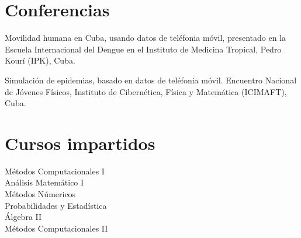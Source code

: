 \documentclass[11pt]{article} %
\begin{document}
\section*{Conferencias}

 Movilidad humana en Cuba, usando datos de tel\'efonia m\'ovil, presentado en la Escuela Internacional del Dengue en el Instituto de Medicina Tropical, Pedro Kour\'i (IPK), Cuba.

 Simulaci\'on de epidemias, basado en datos de tel\'efonia m\'ovil. Encuentro Nacional de J\'ovenes F\'isicos, Instituto de Cibern\'etica, F\'isica y Matem\'atica (ICIMAFT), Cuba.








\section*{Cursos impartidos}

 M\'etodos Computacionales I\\
 An\'alisis Matem\'atico I\\
 M\'etodos N\'umericos\\
 Probabilidades y Estad\'istica\\
 \'Algebra II \\
 M\'etodos Computacionales II
\end{document}
